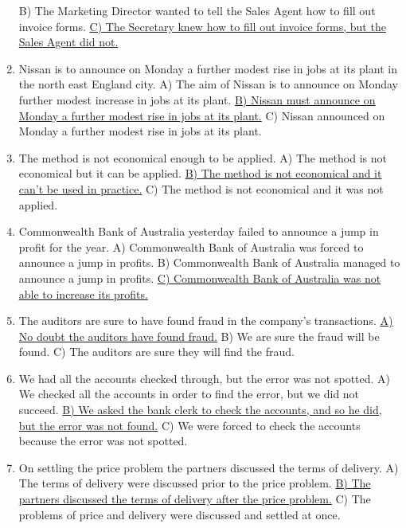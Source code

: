 \documentclass[main.tex]{subfiles}
\begin{document}
\begin{enumerate}[nosep, leftmargin=*]
		B) The Marketing Director wanted to tell the Sales Agent how to fill out invoice forms.\newline
		\uline{C) The Secretary knew how to fill out invoice forms, but the Sales Agent did not.}
	\item Nissan is to announce on Monday a further modest rise in jobs at its plant in the north east England city.\newline
		A) The aim of Nissan is to announce on Monday further modest increase in jobs at its plant.\newline
		\uline{B) Nissan must announce on Monday a further modest rise in jobs at its plant.}\newline
		C) Nissan announced on Monday a further modest rise in jobs at its plant.
	\item The method is not economical enough to be applied.\newline
		A) The method is not economical but it can be applied.\newline
		\uline{B) The method is not economical and it can't be used in practice.}\newline
		C) The method is not economical and it was not applied.
	\item Commonwealth Bank of Australia yesterday failed to announce a jump in profit for the year.\newline
		A) Commonwealth Bank of Australia was forced to announce a jump in profits.\newline
		B) Commonwealth Bank of Australia managed to announce a jump in profits.\newline
		\uline{C) Commonwealth Bank of Australia was not able to increase its profits.}
	\item The auditors are sure to have found fraud in the company's transactions.\newline
		\uline{A) No doubt the auditors have found fraud.}\newline
		B) We are sure the fraud will be found.\newline
		C) The auditors are sure they will find the fraud.
	\item We had all the accounts checked through, but the error was not spotted.\newline
		A) We checked all the accounts in order to find the error, but we did not succeed.\newline
		\uline{B) We asked the bank clerk to check the accounts, and so he did, but the error was not found.}\newline
		C) We were forced to check the accounts because the error was not spotted.
	\item On settling the price problem the partners discussed the terms of delivery.\newline
		A) The terms of delivery were discussed prior to the price problem.\newline
		\uline{B) The partners discussed the terms of delivery after the price problem.}\newline
		C) The problems of price and delivery were discussed and settled at once.
\end{enumerate}
\ 
\end{document}
